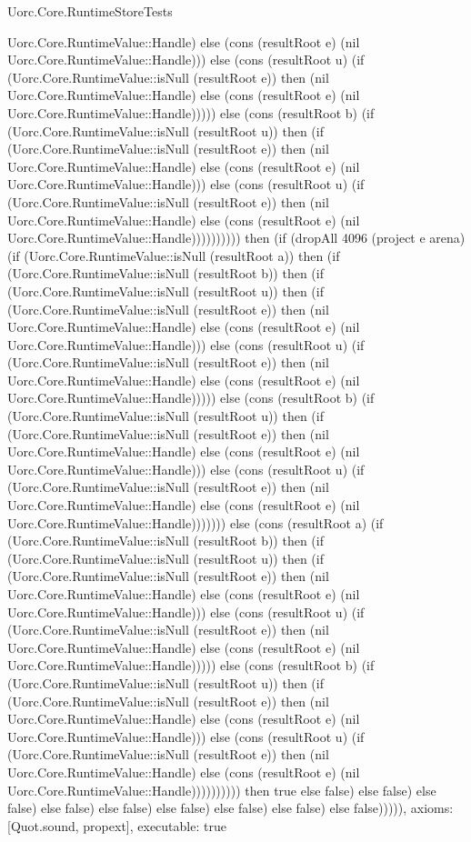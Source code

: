 \begin{lexlean}{Uorc.Core.RuntimeStoreTests}
\begin{semanticmodule}
{Uorc.Core.RuntimeValue::Handle) else (cons (resultRoot e) (nil Uorc.Core.RuntimeValue::Handle))) else (cons (resultRoot u) (if (Uorc.Core.RuntimeValue::isNull (resultRoot e)) then (nil Uorc.Core.RuntimeValue::Handle) else (cons (resultRoot e) (nil Uorc.Core.RuntimeValue::Handle))))) else (cons (resultRoot b) (if (Uorc.Core.RuntimeValue::isNull (resultRoot u)) then (if (Uorc.Core.RuntimeValue::isNull (resultRoot e)) then (nil Uorc.Core.RuntimeValue::Handle) else (cons (resultRoot e) (nil Uorc.Core.RuntimeValue::Handle))) else (cons (resultRoot u) (if (Uorc.Core.RuntimeValue::isNull (resultRoot e)) then (nil Uorc.Core.RuntimeValue::Handle) else (cons (resultRoot e) (nil Uorc.Core.RuntimeValue::Handle)))))))))) then (if (dropAll 4096 (project e arena) (if (Uorc.Core.RuntimeValue::isNull (resultRoot a)) then (if (Uorc.Core.RuntimeValue::isNull (resultRoot b)) then (if (Uorc.Core.RuntimeValue::isNull (resultRoot u)) then (if (Uorc.Core.RuntimeValue::isNull (resultRoot e)) then (nil Uorc.Core.RuntimeValue::Handle) else (cons (resultRoot e) (nil Uorc.Core.RuntimeValue::Handle))) else (cons (resultRoot u) (if (Uorc.Core.RuntimeValue::isNull (resultRoot e)) then (nil Uorc.Core.RuntimeValue::Handle) else (cons (resultRoot e) (nil Uorc.Core.RuntimeValue::Handle))))) else (cons (resultRoot b) (if (Uorc.Core.RuntimeValue::isNull (resultRoot u)) then (if (Uorc.Core.RuntimeValue::isNull (resultRoot e)) then (nil Uorc.Core.RuntimeValue::Handle) else (cons (resultRoot e) (nil Uorc.Core.RuntimeValue::Handle))) else (cons (resultRoot u) (if (Uorc.Core.RuntimeValue::isNull (resultRoot e)) then (nil Uorc.Core.RuntimeValue::Handle) else (cons (resultRoot e) (nil Uorc.Core.RuntimeValue::Handle))))))) else (cons (resultRoot a) (if (Uorc.Core.RuntimeValue::isNull (resultRoot b)) then (if (Uorc.Core.RuntimeValue::isNull (resultRoot u)) then (if (Uorc.Core.RuntimeValue::isNull (resultRoot e)) then (nil Uorc.Core.RuntimeValue::Handle) else (cons (resultRoot e) (nil Uorc.Core.RuntimeValue::Handle))) else (cons (resultRoot u) (if (Uorc.Core.RuntimeValue::isNull (resultRoot e)) then (nil Uorc.Core.RuntimeValue::Handle) else (cons (resultRoot e) (nil Uorc.Core.RuntimeValue::Handle))))) else (cons (resultRoot b) (if (Uorc.Core.RuntimeValue::isNull (resultRoot u)) then (if (Uorc.Core.RuntimeValue::isNull (resultRoot e)) then (nil Uorc.Core.RuntimeValue::Handle) else (cons (resultRoot e) (nil Uorc.Core.RuntimeValue::Handle))) else (cons (resultRoot u) (if (Uorc.Core.RuntimeValue::isNull (resultRoot e)) then (nil Uorc.Core.RuntimeValue::Handle) else (cons (resultRoot e) (nil Uorc.Core.RuntimeValue::Handle)))))))))) then true else false) else false) else false) else false) else false) else false) else false) else false) else false))))),
  axioms: [Quot.sound, propext],
  executable: true
}


\end{semanticmodule}
\end{lexlean}
